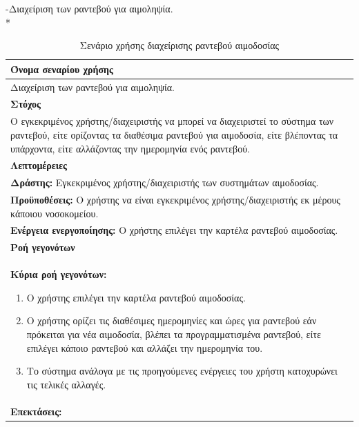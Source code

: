 -Διαχείριση των ραντεβού για αιμοληψία.
\\*
\begin{table}[H]
	\begin{center}
	    \begin{tabular}{|p{\dimexpr \linewidth-2\tabcolsep}|}
	    \hline
	    \rowcolor{grayy}
	    \textbf{Όνομα σεναρίου χρήσης}
	    \\ \hline    
	     Διαχείριση των ραντεβού για αιμοληψία.
	     \\ \hline
	    \rowcolor{grayy}
	    \textbf{\textbf{Στόχος}}
	    \\ \hline
	 	 Ο εγκεκριμένος χρήστης/διαχειριστής να μπορεί να διαχειριστεί το σύστημα των ραντεβού, είτε ορίζοντας τα διαθέσιμα ραντεβού για αιμοδοσία, είτε βλέποντας τα υπάρχοντα, είτε αλλάζοντας την ημερομηνία ενός ραντεβού.
	    \\ \hline
	    \rowcolor{grayy}
	    \textbf{Λεπτομέρειες}
	    \\ \hline
		\textbf{Δράστης:} Εγκεκριμένος χρήστης/διαχειριστής των συστημάτων αιμοδοσίας.
		\\*
		\textbf{Προϋποθέσεις:} Ο χρήστης να είναι εγκεκριμένος χρήστης/διαχειριστής εκ μέρους κάποιου νοσοκομείου.
		\\*
		\textbf{Ενέργεια ενεργοποίησης:} Ο χρήστης επιλέγει την καρτέλα ραντεβού αιμοδοσίας.
		\\ \hline
		\rowcolor{grayy}    
	    \textbf{Ροή γεγονότων}
	    \\ \hline
		\textbf{Κύρια ροή γεγονότων:}
		\begin{enumerate}
			\item	 Ο χρήστης επιλέγει την καρτέλα ραντεβού αιμοδοσίας.
			\item  Ο χρήστης ορίζει τις διαθέσιμες ημερομηνίες και ώρες για ραντεβού εάν πρόκειται για νέα  αιμοδοσία, βλέπει τα προγραμματισμένα ραντεβού, είτε επιλέγει κάποιο ραντεβού και αλλάζει την ημερομηνία του. 
			\item Το σύστημα ανάλογα με τις προηγούμενες ενέργειες του χρήστη κατοχυρώνει τις τελικές αλλαγές.
		\end{enumerate}
		\\ \hline
		\textbf{Επεκτάσεις:}
		   \\ \hline
	    \end{tabular}
	    \caption{Σενάριο χρήσης διαχείρισης ραντεβού αιμοδοσίας}
	    \label{tab:blood_donation_reservation_management_superadmin} 
	\end{center}
\end{table}	



